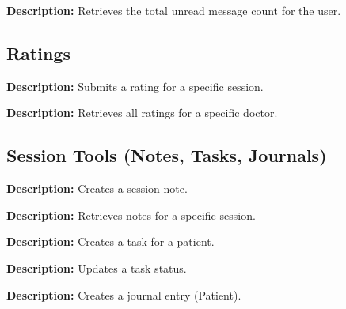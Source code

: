 \documentclass{article}
\begin{document}
\begin{tcolorbox}[title=\textcolor{accent}{GET} /api/chat/unread-count]
\textbf{Description:} Retrieves the total unread message count for the user.
\end{tcolorbox}

\subsection{Ratings}

\begin{tcolorbox}[title=\textcolor{accent}{POST} /api/ratings/:sessionId/rate]
\textbf{Description:} Submits a rating for a specific session.
\end{tcolorbox}

\begin{tcolorbox}[title=\textcolor{accent}{GET} /api/ratings/doctor/:doctorId/ratings]
\textbf{Description:} Retrieves all ratings for a specific doctor.
\end{tcolorbox}

\subsection{Session Tools (Notes, Tasks, Journals)}

\begin{tcolorbox}[title=\textcolor{accent}{POST} /api/session-tools/notes]
\textbf{Description:} Creates a session note.
\end{tcolorbox}

\begin{tcolorbox}[title=\textcolor{accent}{GET} /api/session-tools/notes/session/:sessionId]
\textbf{Description:} Retrieves notes for a specific session.
\end{tcolorbox}

\begin{tcolorbox}[title=\textcolor{accent}{POST} /api/session-tools/tasks]
\textbf{Description:} Creates a task for a patient.
\end{tcolorbox}

\begin{tcolorbox}[title=\textcolor{accent}{PUT} /api/session-tools/tasks/:taskId]
\textbf{Description:} Updates a task status.
\end{tcolorbox}

\begin{tcolorbox}[title=\textcolor{accent}{POST} /api/session-tools/journal]
\textbf{Description:} Creates a journal entry (Patient).
\end{tcolorbox}
\end{document}
